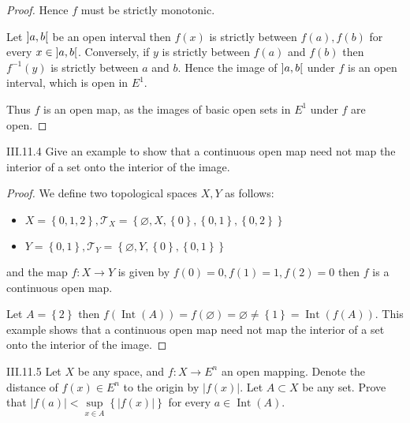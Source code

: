 \begin{proof}
	Hence \( f \) must be strictly monotonic.

	Let \( \left\rbrack{a, b}\right\lbrack \) be an open interval then \( f(x) \) is strictly between \( f(a), f(b) \) for every \( x \in \left\rbrack{a, b}\right\lbrack \). Conversely, if \( y \) is strictly between  \( f(a) \) and \( f(b) \) then \( f^{-1}(y) \) is strictly between \( a \) and \( b \). Hence the image of \( \left\rbrack{a, b}\right\lbrack \) under \( f \) is an open interval, which is open in \( E^{1} \).

	Thus \( f \) is an open map, as the images of basic open sets in \( E^{1} \) under \( f \) are open.
\end{proof}

\begin{problem}{III.11.4}
Give an example to show that a continuous open map need not map the interior of a set onto the interior of the image.
\end{problem}

\begin{proof}
	We define two topological spaces \( X, Y \) as follows:
	\begin{itemize}
		\item \( X = \left\{ 0, 1, 2 \right\}, \mathscr{T}_{X} = \left\{ \varnothing, X, \left\{ 0 \right\}, \left\{ 0, 1 \right\}, \left\{ 0, 2 \right\} \right\} \)
		\item \( Y = \left\{ 0, 1 \right\}, \mathscr{T}_{Y} = \left\{ \varnothing, Y, \left\{ 0 \right\}, \left\{ 0, 1 \right\} \right\} \)
	\end{itemize}

	and the map \( f: X \to Y \) is given by \( f(0) = 0, f(1) = 1, f(2) = 0 \) then \( f \) is a continuous open map.

	Let \( A = \left\{ 2 \right\} \) then \( f(\operatorname{Int}(A)) = f(\varnothing) = \varnothing \ne \left\{ 1 \right\} = \operatorname{Int}(f(A)) \). This example shows that a continuous open map need not map the interior of a set onto the interior of the image.
\end{proof}

\begin{problem}{III.11.5}
Let \(X\) be any space, and \(f: X \to E^{n}\) an open mapping. Denote the distance of \( f(x) \in E^{n} \) to the origin by \( \left\vert f(x) \right\vert \). Let \( A \subset X \) be any set. Prove that \( \left\vert f(a) \right\vert < \sup\limits_{x\in A}\left\{ \left\vert f(x) \right\vert \right\} \) for every \( a \in \operatorname{Int}(A) \).
\end{problem}

